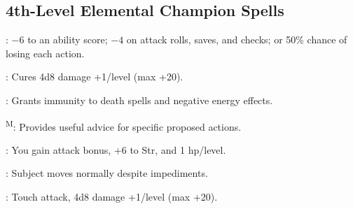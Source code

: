 \subsection{4th-Level Elemental Champion Spells}

: $-6$ to an ability score; $-4$ on attack rolls, saves, and checks; or 50\% chance of losing each action.

: Cures 4d8 damage +1/level (max +20).

: Grants immunity to death spells and negative energy effects.

\textsuperscript{M}: Provides useful advice for specific proposed actions.

: You gain attack bonus, +6 to Str, and 1 hp/level.

: Subject moves normally despite impediments.

: Touch attack, 4d8 damage +1/level (max +20).
